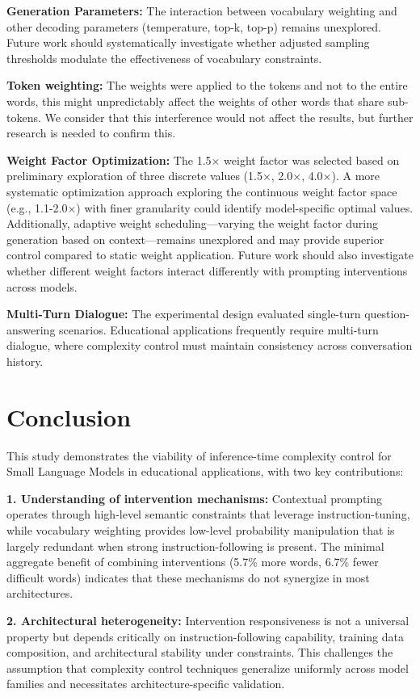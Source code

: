 \documentclass[10pt, a4paper]{article}
\begin{document}
\textbf{Generation Parameters:} The interaction between vocabulary weighting and other decoding parameters (temperature, top-k, top-p) remains unexplored. Future work should systematically investigate whether adjusted sampling thresholds modulate the effectiveness of vocabulary constraints.

\textbf{Token weighting:} The weights were applied to the tokens and not to the entire words, this might unpredictably affect the weights of other words that share sub-tokens. We consider that this interference would not affect the results, but further research is needed to confirm this.

\textbf{Weight Factor Optimization:} The 1.5× weight factor was selected based on preliminary exploration of three discrete values (1.5×, 2.0×, 4.0×). A more systematic optimization approach exploring the continuous weight factor space (e.g., 1.1-2.0×) with finer granularity could identify model-specific optimal values. Additionally, adaptive weight scheduling—varying the weight factor during generation based on context—remains unexplored and may provide superior control compared to static weight application. Future work should also investigate whether different weight factors interact differently with prompting interventions across models.

\textbf{Multi-Turn Dialogue:} The experimental design evaluated single-turn question-answering scenarios. Educational applications frequently require multi-turn dialogue, where complexity control must maintain consistency across conversation history.

\section{Conclusion}

This study demonstrates the viability of inference-time complexity control for Small Language Models in educational applications, with two key contributions:

\textbf{1. Understanding of intervention mechanisms:} Contextual prompting operates through high-level semantic constraints that leverage instruction-tuning, while vocabulary weighting provides low-level probability manipulation that is largely redundant when strong instruction-following is present. The minimal aggregate benefit of combining interventions (5.7\% more words, 6.7\% fewer difficult words) indicates that these mechanisms do not synergize in most architectures.

\textbf{2. Architectural heterogeneity:} Intervention responsiveness is not a universal property but depends critically on instruction-following capability, training data composition, and architectural stability under constraints. This challenges the assumption that complexity control techniques generalize uniformly across model families and necessitates architecture-specific validation.
\end{document}
